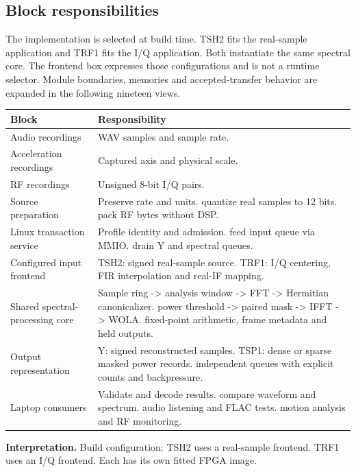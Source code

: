 \documentclass[11pt,letterpaper]{article}
\begin{document}
\subsection*{Block responsibilities}
The implementation is selected at build time. TSH2 fits the real-sample application and TRF1 fits the I/Q application. Both instantiate the same spectral core. The frontend box expresses those configurations and is not a runtime selector. Module boundaries, memories and accepted-transfer behavior are expanded in the following nineteen views.
\par\medskip\noindent
\begin{tabularx}{\linewidth}{@{}>{\raggedright\arraybackslash}p{1.65in}Y@{}}\toprule
\textbf{Block} & \textbf{Responsibility} \\ \midrule
Audio recordings & WAV samples and sample rate. \\[5pt]
Acceleration recordings & Captured axis and physical scale. \\[5pt]
RF recordings & Unsigned 8-bit I/Q pairs. \\[5pt]
Source preparation & Preserve rate and units. quantize real samples to 12 bits. pack RF bytes without DSP. \\[5pt]
Linux transaction service & Profile identity and admission. feed input queue via MMIO. drain Y and spectral queues. \\[5pt]
Configured input frontend & TSH2: signed real-sample source. TRF1: I/Q centering, FIR interpolation and real-IF mapping. \\[5pt]
Shared spectral-processing core & Sample ring -> analysis window -> FFT -> Hermitian canonicalizer. power threshold -> paired mask -> IFFT -> WOLA. fixed-point arithmetic, frame metadata and held outputs. \\[5pt]
Output representation & Y: signed reconstructed samples. TSP1: dense or sparse masked power records. independent queues with explicit counts and backpressure. \\[5pt]
Laptop consumers & Validate and decode results. compare waveform and spectrum. audio listening and FLAC tests. motion analysis and RF monitoring. \\[5pt]
\bottomrule\end{tabularx}
\vspace{8pt}
\noindent\textbf{Interpretation.} Build configuration: TSH2 uses a real-sample frontend. TRF1 uses an I/Q frontend. Each has its own fitted FPGA image.
\clearpage
\end{document}

